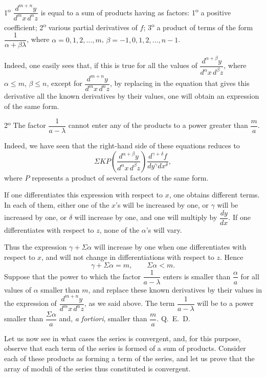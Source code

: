 \documentclass[11pt]{article}
\begin{document}
1\textsuperscript{o} $\dfrac{d^{m+n}y}{d^m x\,d^n z}$ is equal to a sum of products having as factors: 1\textsuperscript{o} a positive coefficient; 2\textsuperscript{o} various partial derivatives of $f$; 3\textsuperscript{o} a product of terms of the form $\dfrac{1}{\alpha+\beta\lambda}$, where $\alpha=0,1,2,\ldots,m$, $\beta=-1,0,1,2,\ldots,n-1$.

Indeed, one easily sees that, if this is true for all the values of $\dfrac{d^{\alpha+\beta}y}{d^\alpha x\,d^\beta z}$, where $\alpha\le m$, $\beta\le n$, except for $\dfrac{d^{m+n}y}{d^m x\,d^n z}$, by replacing in the equation that gives this derivative all the known derivatives by their values, one will obtain an expression of the same form.

2\textsuperscript{o} The factor $\dfrac{1}{a-\lambda}$ cannot enter any of the products to a power greater than $\dfrac{m}{a}$.

Indeed, we have seen that the right-hand side of these equations reduces to
\[
\Sigma KP\left(\frac{d^{\alpha+\beta}y}{d^\alpha x\,d^\beta z}\right)\frac{d^{\gamma+\delta}f}{dy^\gamma dx^\delta},
\]
where $P$ represents a product of several factors of the same form.

If one differentiates this expression with respect to $x$, one obtains different terms. In each of them, either one of the $x$'s will be increased by one, or $\gamma$ will be increased by one, or $\delta$ will increase by one, and one will multiply by $\dfrac{dy}{dx}$. If one differentiates with respect to $z$, none of the $\alpha$'s will vary.

Thus the expression $\gamma+\Sigma\alpha$ will increase by one when one differentiates with respect to $x$, and will not change in differentiations with respect to $z$. Hence
\[
\gamma+\Sigma\alpha=m,
\qquad
\Sigma\alpha<m.
\]
Suppose that the power to which the factor $\dfrac{1}{a-\lambda}$ enters is smaller than $\dfrac{\alpha}{a}$ for all values of $\alpha$ smaller than $m$, and replace these known derivatives by their values in the expression of $\dfrac{d^{m+n}y}{d^m x\,d^n z}$, as we said above. The term $\dfrac{1}{a-\lambda}$ will be to a power smaller than $\dfrac{\Sigma\alpha}{a}$ and, \emph{a fortiori}, smaller than $\dfrac{m}{a}$. \hfill\mbox{Q. E. D.}

Let us now see in what cases the series is convergent, and, for this purpose, observe that each term of the series is formed of a sum of products. Consider each of these products as forming a term of the series, and let us prove that the array of moduli of the series thus constituted is convergent.
\end{document}
